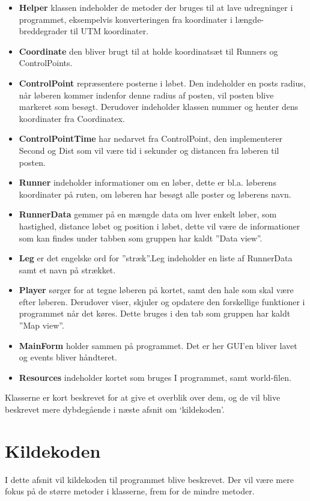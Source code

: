 \begin {itemize}
\item \textbf{Helper} klassen indeholder de metoder der bruges til at lave udregninger i programmet, eksempelvis konverteringen fra  koordinater i længde- breddegrader til UTM koordinater. 
\item \textbf{Coordinate} den bliver brugt til at holde koordinatsæt til Runners og ControlPoints.  
\item \textbf{ControlPoint} repræsentere posterne i løbet. Den indeholder en posts radius, når løberen kommer indenfor denne radius af posten, vil posten blive markeret som besøgt. Derudover indeholder klassen nummer og henter dens koordinater fra Coordinatex.
\item \textbf{ControlPointTime} har nedarvet fra ControlPoint, den implementerer Second og Dist som vil være tid i sekunder og distancen fra løberen til posten. 
\item \textbf{Runner} indeholder informationer om en løber, dette er bl.a. løberens koordinater på ruten, om løberen har besøgt alle poster og løberens navn.
\item \textbf{RunnerData} gemmer på en mængde data om hver enkelt løber, som hastighed, distance løbet og position i løbet, dette vil være de informationer som kan findes under tabben som gruppen har kaldt ”Data view”. 
\item \textbf{Leg} er det engelske ord for ”stræk”.Leg indeholder en liste af RunnerData samt et navn på strækket.
\item \textbf{Player} sørger for at tegne løberen på kortet, samt den hale som skal være efter løberen. Derudover viser, skjuler og opdatere den forskellige funktioner i programmet når det køres. Dette bruges i den tab som gruppen har kaldt ”Map view”.
\item \textbf{MainForm} holder sammen på programmet. Det er her GUI’en bliver lavet og events bliver håndteret.
\item \textbf{Resources} indeholder kortet som bruges I programmet, samt world-filen.
\end {itemize}

Klasserne er kort beskrevet for at give et overblik over dem, og de vil blive beskrevet mere dybdegående i næste afsnit om ‘kildekoden’.

\section{Kildekoden}
I dette afsnit vil kildekoden til programmet blive beskrevet. Der vil være mere fokus på de større metoder i klasserne, frem for de mindre metoder.

